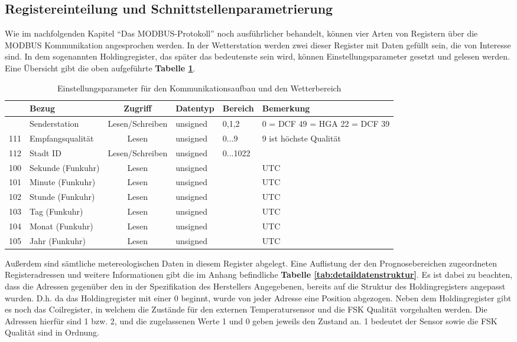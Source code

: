 \subsection{Registereinteilung und Schnittstellenparametrierung}
Wie im nachfolgenden Kapitel \enquote{Das MODBUS-Protokoll} noch ausführlicher behandelt, können vier Arten von Registern über die MODBUS Kommunikation angesprochen werden. In der Wetterstation werden zwei dieser Register mit Daten gefüllt sein, die von Interesse sind. In dem sogenannten Holdingregister, das später das bedeutenste sein wird, können Einstellungsparameter gesetzt und gelesen werden.\label{comsetreg} Eine Übersicht gibt die oben aufgeführte \textbf{Tabelle \ref{tab:kommeinstpara}}.
\begin{table}[t]
\caption{Einstellungsparameter für den Kommunikationsaufbau und den Wetterbereich}
{
\setlength{\extrarowheight}{0.1cm}
\begin{tabular}{| c | l | c | l | l | p{2.5cm} |}
\hline
\textbf{\parbox[t]{1.8cm}{Register-\\adresse}} & \textbf{Bezug} & \textbf{Zugriff} & \textbf{Datentyp} & \textbf{Bereich} & \textbf{Bemerkung}\\[1cm]
\hline \hline
\hiderowcolors
110 & Senderstation & Lesen/Schreiben & unsigned & 0,1,2 & 0 = DCF 49 \newline 1 = HGA 22 \newline 2 = DCF 39\\
111 & Empfangsqualität & Lesen & unsigned & 0...9 & 9 ist höchste Qualität\\
112 & Stadt ID & Lesen/Schreiben & unsigned & 0...1022 & \\
100 & Sekunde (Funkuhr) & Lesen & unsigned & & UTC\\ 
101 & Minute (Funkuhr) & Lesen & unsigned & & UTC\\
102 & Stunde (Funkuhr) & Lesen & unsigned & & UTC\\
103 & Tag (Funkuhr) & Lesen & unsigned & & UTC\\
104 & Monat (Funkuhr) & Lesen & unsigned & & UTC\\
105 & Jahr (Funkuhr) & Lesen & unsigned & & UTC\\
\hline
\end{tabular}
}
\label{tab:kommeinstpara}
\end{table} 
Außerdem sind sämtliche metereologischen Daten in diesem Register abgelegt. Eine Auflistung der den Prognosebereichen zugeordneten Registeradressen und weitere Informationen gibt die im Anhang befindliche \textbf{Tabelle \ref{tab:detaildatenstruktur}}. Es ist dabei zu beachten, dass die Adressen gegenüber den in der Spezifikation des Herstellers Angegebenen, bereits auf die Struktur des Holdingregisters angepasst wurden. D.h. da das Holdingregister mit einer 0 beginnt, wurde von jeder Adresse eine Position abgezogen. Neben dem Holdingregister gibt es noch das Coilregister, in welchem die Zustände für den externen Temperatursensor und die FSK Qualität vorgehalten werden. Die Adressen hierfür sind 1 bzw. 2, und die zugelassenen Werte 1 und 0 geben jeweils den Zustand an. 1 bedeutet der Sensor sowie die FSK Qualität sind in Ordnung.\label{coilabfrage} 
